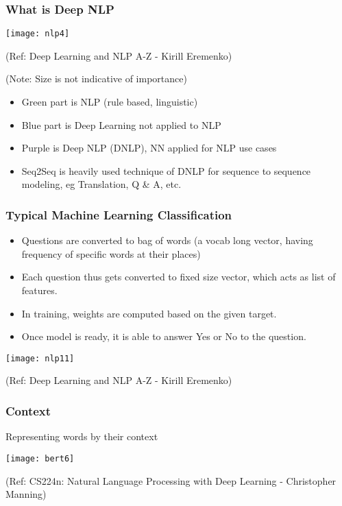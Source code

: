 \begin{frame}[fragile]\frametitle{What is Deep NLP}
\begin{center}
\texttt{[image: nlp4]}

\tiny{(Ref: Deep Learning and NLP A-Z - Kirill Eremenko)}

\tiny{(Note: Size is not indicative of importance)}
\end{center}

	\begin{itemize}
	\item Green part is NLP (rule based, linguistic)
	\item Blue part is Deep Learning not applied to NLP
	\item Purple is Deep NLP (DNLP), NN applied for NLP use cases
	\item Seq2Seq is heavily used technique of DNLP for sequence to sequence modeling, eg Translation, Q \& A, etc.
	\end{itemize}
	

\end{frame}


\begin{frame}[fragile]\frametitle{Typical Machine Learning Classification}
	\begin{itemize}
	\item Questions are converted to bag of words (a vocab long vector, having frequency of specific words at their places)
		\item Each question thus gets converted to fixed size vector, which acts as list of features.
		\item In training, weights are computed based on the given target.
		\item Once model is ready, it is able to answer Yes or No to the question.
			\end{itemize}
\begin{center}
\texttt{[image: nlp11]}

\tiny{(Ref: Deep Learning and NLP A-Z - Kirill Eremenko)}
\end{center}

\end{frame}


\begin{frame}[fragile]\frametitle{Context}

Representing words by their context

\begin{center}
\texttt{[image: bert6]}
\end{center}		  


{\tiny (Ref: CS224n: Natural Language Processing with Deep Learning - Christopher Manning)}

\end{frame}

